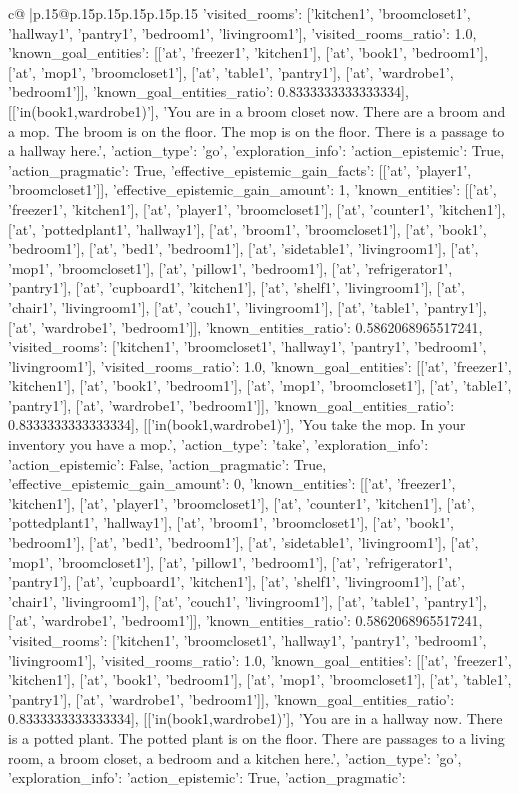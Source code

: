 \documentclass{article}
\begin{document}
{\begin{supertabular}{c@{$\;$}|p{.15\linewidth}@{}p{.15\linewidth}p{.15\linewidth}p{.15\linewidth}p{.15\linewidth}p{.15\linewidth}}
{{{'visited_rooms': ['kitchen1', 'broomcloset1', 'hallway1', 'pantry1', 'bedroom1', 'livingroom1'], 'visited_rooms_ratio': 1.0, 'known_goal_entities': [['at', 'freezer1', 'kitchen1'], ['at', 'book1', 'bedroom1'], ['at', 'mop1', 'broomcloset1'], ['at', 'table1', 'pantry1'], ['at', 'wardrobe1', 'bedroom1']], 'known_goal_entities_ratio': 0.8333333333333334}}], [['in(book1,wardrobe1)'], 'You are in a broom closet now. There are a broom and a mop. The broom is on the floor. The mop is on the floor. There is a passage to a hallway here.', {'action_type': 'go', 'exploration_info': {'action_epistemic': True, 'action_pragmatic': True, 'effective_epistemic_gain_facts': [['at', 'player1', 'broomcloset1']], 'effective_epistemic_gain_amount': 1, 'known_entities': [['at', 'freezer1', 'kitchen1'], ['at', 'player1', 'broomcloset1'], ['at', 'counter1', 'kitchen1'], ['at', 'pottedplant1', 'hallway1'], ['at', 'broom1', 'broomcloset1'], ['at', 'book1', 'bedroom1'], ['at', 'bed1', 'bedroom1'], ['at', 'sidetable1', 'livingroom1'], ['at', 'mop1', 'broomcloset1'], ['at', 'pillow1', 'bedroom1'], ['at', 'refrigerator1', 'pantry1'], ['at', 'cupboard1', 'kitchen1'], ['at', 'shelf1', 'livingroom1'], ['at', 'chair1', 'livingroom1'], ['at', 'couch1', 'livingroom1'], ['at', 'table1', 'pantry1'], ['at', 'wardrobe1', 'bedroom1']], 'known_entities_ratio': 0.5862068965517241, 'visited_rooms': ['kitchen1', 'broomcloset1', 'hallway1', 'pantry1', 'bedroom1', 'livingroom1'], 'visited_rooms_ratio': 1.0, 'known_goal_entities': [['at', 'freezer1', 'kitchen1'], ['at', 'book1', 'bedroom1'], ['at', 'mop1', 'broomcloset1'], ['at', 'table1', 'pantry1'], ['at', 'wardrobe1', 'bedroom1']], 'known_goal_entities_ratio': 0.8333333333333334}}], [['in(book1,wardrobe1)'], 'You take the mop. In your inventory you have a mop.', {'action_type': 'take', 'exploration_info': {'action_epistemic': False, 'action_pragmatic': True, 'effective_epistemic_gain_amount': 0, 'known_entities': [['at', 'freezer1', 'kitchen1'], ['at', 'player1', 'broomcloset1'], ['at', 'counter1', 'kitchen1'], ['at', 'pottedplant1', 'hallway1'], ['at', 'broom1', 'broomcloset1'], ['at', 'book1', 'bedroom1'], ['at', 'bed1', 'bedroom1'], ['at', 'sidetable1', 'livingroom1'], ['at', 'mop1', 'broomcloset1'], ['at', 'pillow1', 'bedroom1'], ['at', 'refrigerator1', 'pantry1'], ['at', 'cupboard1', 'kitchen1'], ['at', 'shelf1', 'livingroom1'], ['at', 'chair1', 'livingroom1'], ['at', 'couch1', 'livingroom1'], ['at', 'table1', 'pantry1'], ['at', 'wardrobe1', 'bedroom1']], 'known_entities_ratio': 0.5862068965517241, 'visited_rooms': ['kitchen1', 'broomcloset1', 'hallway1', 'pantry1', 'bedroom1', 'livingroom1'], 'visited_rooms_ratio': 1.0, 'known_goal_entities': [['at', 'freezer1', 'kitchen1'], ['at', 'book1', 'bedroom1'], ['at', 'mop1', 'broomcloset1'], ['at', 'table1', 'pantry1'], ['at', 'wardrobe1', 'bedroom1']], 'known_goal_entities_ratio': 0.8333333333333334}}], [['in(book1,wardrobe1)'], 'You are in a hallway now. There is a potted plant. The potted plant is on the floor. There are passages to a living room, a broom closet, a bedroom and a kitchen here.', {'action_type': 'go', 'exploration_info': {'action_epistemic': True, 'action_pragmatic': }}}
\end{supertabular}}
\end{document}
